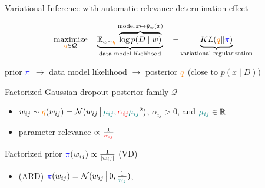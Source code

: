 \documentclass{beamer}
\newcommand{\real}{\mathbb{R}}
\begin{document}
\begin{frame}[c]{\insertsubsection}{\insertsection}
  Variational Inference with automatic relevance determination effect



  $$
    \underset{
      {\color{orange} q} \in \mathcal{Q}
    }{\text{maximize}}
    \quad
    \underbrace{
      \mathbb{E}_{w \sim {\color{orange} q}}
        \overbrace{
          \log p(D\mid w)  %
        }^{
          \text{model}
          \,
          x\mapsto \hat{y}_w(x)
        }
    }_{
      \text{data model likelihood}
    }
    \quad
    - \underbrace{
      KL({\color{orange} q}\|{\color{blue} \pi})
    }_{
      \text{variational regularization}
    }
    $$

  \medskip
  prior ${\color{blue} \pi}$
    $\to$ data model likelihood
    $\to$ posterior ${\color{orange} q}$
    (close to $p(x \mid D)$)
  
  \bigskip
  Factorized Gaussian dropout posterior family $\mathcal{Q}$
  \begin{itemize}
    \item $
      w_{ij} \sim {\color{orange} q}(w_{ij})
        = \mathcal{N}(
          w_{ij}\,\big\vert\,
          {\color{teal} \mu_{ij}},
          {\color{red} \alpha_{ij}}
            {\color{teal} \mu_{ij}}^2
        )
    $, $\alpha_{ij} > 0$, and ${\color{teal} \mu_{ij}} \in \real$
    \item parameter relevance $\propto \frac1{{\color{red} \alpha_{ij}}}$
  \end{itemize}

  \smallskip
  Factorized prior $
    {\color{blue} \pi}(w_{ij})
      \propto \frac1{\lvert w_{ij}\rvert}
  $ (VD)
  \begin{itemize}
    \item (ARD) $
      {\color{blue} \pi}(w_{ij}) = \mathcal{N}(
        w_{ij}\,\big\vert\,
        0, \tfrac1{{\color{teal} \tau_{ij}}}
      )
    $, \citep{kharitonov_variational_2018}
  \end{itemize}
\end{frame}
\end{document}

